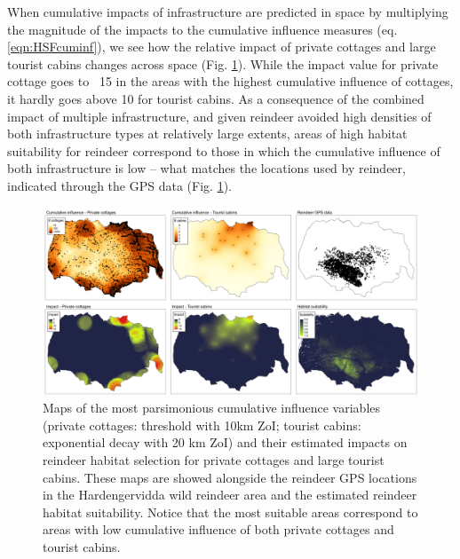 \documentclass[titlepage]{article}
\begin{document}
When cumulative impacts of infrastructure are predicted in space by multiplying the magnitude of the impacts to the cumulative influence measures (eq. \ref{eqn:HSFcuminf}), we see how the relative impact of private cottages and large tourist cabins changes across space (Fig. \ref{fig:prediction_maps}). While the impact value for private cottage goes to ~15 in the areas with the highest cumulative influence of cottages, it hardly goes above 10 for tourist cabins. As a consequence of the combined impact of multiple infrastructure, and given reindeer
avoided high densities of both infrastructure types at relatively large extents, 
areas of high habitat suitability for reindeer correspond to those in which the
cumulative influence of both infrastructure is low -- what matches the
locations used by reindeer, indicated through the GPS data (Fig. \ref{fig:prediction_maps}).

\begin{figure}[h]
\centering
\includegraphics[width=1.3\textwidth,center]{figures/reindeer_results_prediction_maps.png}
\caption{\label{fig:prediction_maps} Maps of the most parsimonious cumulative influence variables (private cottages: threshold with 10km ZoI; tourist cabins: exponential decay with 20 km ZoI) and their estimated impacts on reindeer habitat selection for private cottages and large tourist cabins. These maps are showed alongside the reindeer GPS locations in the Hardengervidda wild reindeer area and the estimated reindeer habitat suitability. Notice that the most suitable areas correspond to areas with low cumulative influence of both private cottages and tourist cabins.}
\end{figure}

\end{document}
